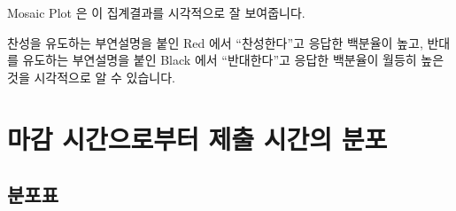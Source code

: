 \documentclass[
]{book}
\begin{document}
Mosaic Plot 은 이 집계결과를 시각적으로 잘 보여줍니다.

찬성을 유도하는 부연설명을 붙인 Red 에서 ``찬성한다''고 응답한 백분율이 높고, 반대를 유도하는 부연설명을 붙인 Black 에서 ``반대한다''고 응답한 백분율이 월등히 높은 것을 시각적으로 알 수 있습니다.

\section{마감 시간으로부터 제출 시간의 분포}\label{uxb9c8uxac10-uxc2dcuxac04uxc73cuxb85cuxbd80uxd130-uxc81cuxcd9c-uxc2dcuxac04uxc758-uxbd84uxd3ec-3}

\subsection{분포표}\label{uxbd84uxd3ecuxd45c-3}
\end{document}
